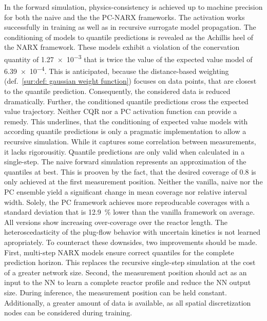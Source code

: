 In the forward simulation, physics-consistency is achieved up to machine
precision for both the naive and the the PC-NARX frameworks. The activation
works successfully in training as well as in recursive surrogate model propagation.
\newline
\newline
\noindent
The conditioning of models to quantile predictions is revealed as the Achillis heel of the NARX framework. 
These models exhibit a violation of the conervation quantity of \SI{1.27e-3}{} 
that is twice the value of the expected value model of \SI{6.39e-4}{}. 
This is anticipated, because the distance-based weighting (def.~\ref{sur:def: gaussian weight function})
focuses on data points, that are 
closest to the quantile prediction. Consequently, the considered data is reduced dramatically.
Further, the conditioned quantile predictions cross the expected value trajectory. Neither CQR nor
a PC activation function can provide a remedy. This underlines, that the conditioning of 
expected value models with according quantile predictions is only a pragmatic implementation
to allow a recursive simulation. While it captures some correlation
between measurements, it lacks rigorousitiy. Quantile predictions are only valid when calculated
in a single-step. The naive forward simulation represents an approximation of the quantiles at best.
This is prooven by the fact, that the desired coverage of $0.8$ is only achieved at the first
measurement position. Neither the vanilla, naive nor the PC ensemble
yield a significant change in mean coverage nor relative interval width. Solely, the PC framework
achieves more reproducable coverages with a standard deviation that is \SI{12.9}{\%} lower 
than the vanilla framework on average. All versions show increasing over-coverage 
over the reactor length. The heteroscedasticity of the plug-flow behavior
with uncertain kinetics is not learned apropriately.
\newline
\newline
\noindent
To counteract these downsides, two improvements should be made. First, multi-step NARX models
ensure correct quantiles for the complete prediction horizon. This replaces the recursive
single-step simulation at the cost of a greater network size. Second, the measurement position
should act as an input to the NN to learn a complete reactor profile and reduce the NN output size.
During inference, the
measurement position can be held constant. Additionally, a greater amount of data is available, as 
all spatial discretization nodes can be considered during training.
